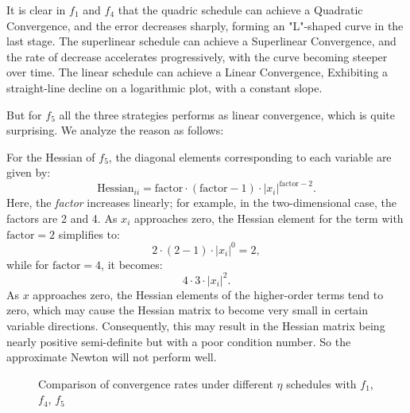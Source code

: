 \documentclass[12pt]{article}
\begin{document}
It is clear in $f_1$ and $f_4$ that the quadric schedule can achieve a Quadratic Convergence, and the error decreases sharply, forming an "L"-shaped curve in the last stage. The superlinear schedule can achieve a Superlinear Convergence, and the rate of decrease accelerates progressively, with the curve becoming steeper over time. The linear schedule can achieve a Linear Convergence, Exhibiting a straight-line decline on a logarithmic plot, with a constant slope.

But for $f_5$ all the three strategies performs as linear convergence, which is quite surprising. We analyze the reason as follows:

For the Hessian of $f_5$, the diagonal elements corresponding to each variable are given by:
\[
\text{Hessian}_{ii} = \text{factor} \cdot (\text{factor} - 1) \cdot |x_i|^{\text{factor} - 2}.
\]
Here, the \textit{factor} increases linearly; for example, in the two-dimensional case, the factors are 2 and 4. As $x_i$ approaches zero, the Hessian element for the term with $\text{factor} = 2$ simplifies to:
\[
2 \cdot (2-1) \cdot |x_i|^0 = 2,
\]
while for $\text{factor} = 4$, it becomes:
\[
4 \cdot 3 \cdot |x_i|^2.
\]
As $x$ approaches zero, the Hessian elements of the higher-order terms tend to zero, which may cause the Hessian matrix to become very small in certain variable directions. Consequently, this may result in the Hessian matrix being nearly positive semi-definite but with a poor condition number. So the approximate Newton will not perform well.


\begin{figure}[ht]
\centering
{}
\caption[]{Comparison of convergence rates under different $\eta$ schedules with $f_1$, $f_4$, $f_5$}
\label{fig:convgraph}
\end{figure}
\end{document}
